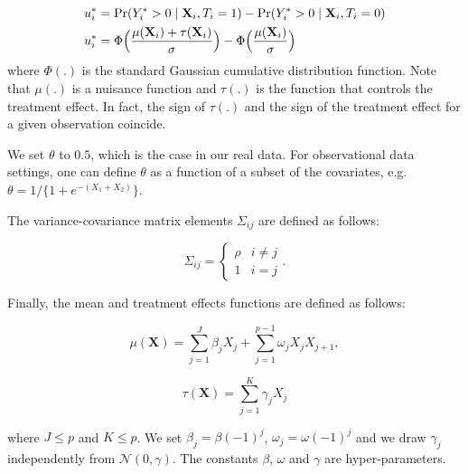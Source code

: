 \documentclass{article}
\def\X{\mathbf X}
\begin{document}
\begin{align*}
    u_i^* &= \mathrm{Pr}(Y_i^* > 0 \mid \X_i, T_i = 1) - \mathrm{Pr}(Y_i^* > 0 \mid \X_i, T_i = 0)\\
    u_i^* &= \Phi \Bigl( \frac{\mu(\X_i) + \tau(\X_i)}{\sigma} \Bigr) - \Phi \Big( \frac{\mu(\X_i)}{\sigma} \Big) 
\end{align*}
where $\Phi(.)$ is the standard Gaussian cumulative distribution function. Note that $\mu(.)$ is a nuisance function and $\tau(.)$ is the function that controls the treatment effect. In fact, the sign of $\tau(.)$ and the sign of the treatment effect for a given observation coincide.

We set $\theta$ to $0.5$, which is the case in our real data. For observational data settings, one can define $\theta$ as a function of a subset of the covariates, e.g. $\theta= 1 / \{1 + e^{-(X_1 + X_2)} \}$. 

The variance-covariance matrix elements $\Sigma_{ij}$ are defined as follows:

\[\Sigma_{ij} = \begin{cases} 
      \rho & i\neq j \\
      1 & i=j
   \end{cases}.
\]

Finally, the mean and treatment effects functions are defined as follows:

$$\mu(\X) = \sum_{j=1}^J \beta_j X_j + \sum_{j=1}^{p-1} \omega_j X_j X_{j+1},$$ 


$$\tau(\X) = \sum_{j=1}^K \gamma_j X_j$$

where $J\leq p$ and $K \leq p$. We set $\beta_j = \beta (-1)^{j}$, $\omega_j = \omega (-1)^j$ and we draw $\gamma_j$ independently from $\mathcal{N}(0,\gamma)$. The constants $\beta$, $\omega$ and $\gamma$ are hyper-parameters.







\end{document}
